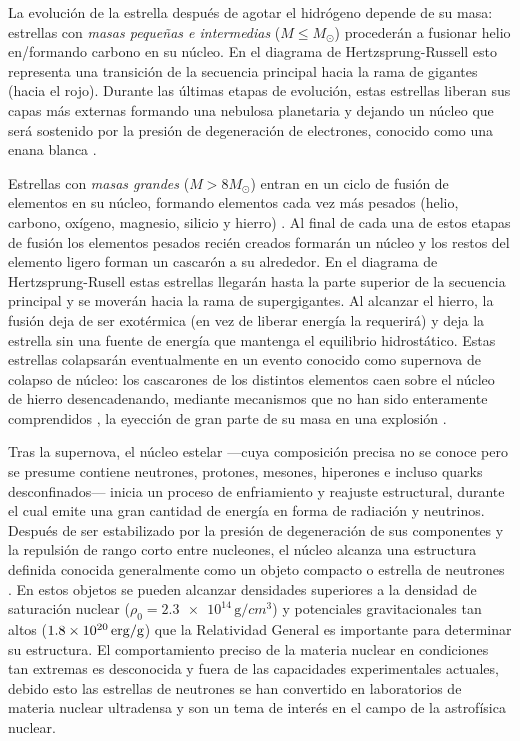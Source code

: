 La evolución de la estrella después de agotar el hidrógeno depende de su masa: estrellas con \emph{masas pequeñas e intermedias} ($M\leq M_{\odot}$) procederán a fusionar helio en/formando carbono en su núcleo. En el diagrama de Hertzsprung-Russell esto representa una transición de la secuencia principal hacia la rama de gigantes (hacia el rojo). Durante las últimas etapas de evolución, estas estrellas liberan sus capas más externas formando una nebulosa planetaria y dejando un núcleo que será sostenido por la presión de degeneración de electrones, conocido como una enana blanca \cite{Padmanabhan2000}.

Estrellas con \emph{masas grandes} ($M>8 M_{\odot}$) entran en un ciclo de fusión de elementos en su núcleo, formando elementos cada vez más pesados (helio, carbono, oxígeno, magnesio, silicio y hierro) \cite{Glendenning2000}. Al final de cada una de estos etapas de fusión los elementos pesados recién creados formarán un núcleo y los restos del elemento ligero forman un cascarón a su alrededor. En el diagrama de Hertzsprung-Rusell estas estrellas llegarán hasta la parte superior de la secuencia principal y se moverán hacia la rama de supergigantes. Al alcanzar el hierro, la fusión deja de ser exotérmica (en vez de liberar energía la requerirá) y deja la estrella sin una fuente de energía que mantenga el equilibrio hidrostático. Estas estrellas colapsarán eventualmente en un evento conocido como supernova de colapso de núcleo: los cascarones de los distintos elementos caen sobre el núcleo de hierro desencadenando, mediante mecanismos que no han sido enteramente comprendidos \cite{Janka2012}, la eyección de gran parte de su masa en una explosión \cite{Woosley2005}.

Tras la supernova, el núcleo estelar —cuya composición precisa no se conoce pero se presume contiene neutrones, protones, mesones, hiperones e incluso quarks desconfinados— inicia un proceso de enfriamiento y reajuste estructural, durante el cual emite una gran cantidad de energía en forma de radiación y neutrinos. Después de ser estabilizado por la presión de degeneración de sus componentes y la repulsión de rango corto entre nucleones, el núcleo alcanza una estructura definida conocida generalmente como un objeto compacto o estrella de neutrones \cite{Lattimer2004}.
En estos objetos se pueden alcanzar densidades superiores a la densidad de saturación nuclear ($\rho_0 = \num{2.3e+14}\,\si{\g/cm^3}$) y potenciales gravitacionales tan altos ($\num{1.8e+20}\,\rm{erg/g}$) que la Relatividad General es importante para determinar su estructura. El comportamiento preciso de la materia nuclear en condiciones tan extremas es desconocida y fuera de las capacidades experimentales actuales, debido esto las estrellas de neutrones se han convertido en laboratorios de materia nuclear ultradensa y son un tema de interés en el campo de la astrofísica nuclear.

